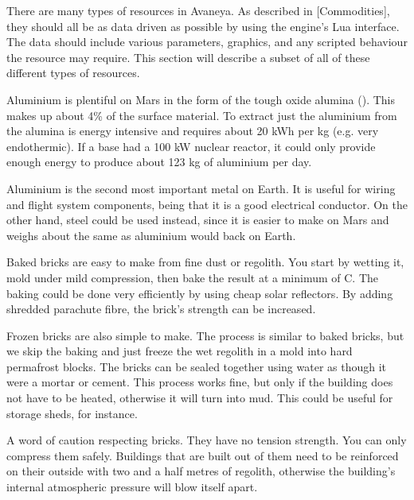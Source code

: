 

There are many types of resources in Avaneya. As described in [Commodities], they should all be as data driven as possible by using the engine’s Lua interface. The data should include various parameters, graphics, and any scripted behaviour the resource may require. This section will describe a subset of all of these different types of resources.

Aluminium is plentiful on Mars in the form of the tough oxide alumina (). This makes up about 4\% of the surface material. To extract just the aluminium from the alumina is energy intensive and requires about 20 kWh per kg (e.g. very endothermic). If a base had a 100 kW nuclear reactor, it could only provide enough energy to produce about 123 kg of aluminium per day.

Aluminium is the second most important metal on Earth. It is useful for wiring and flight system components, being that it is a good electrical conductor. On the other hand, steel could be used instead, since it is easier to make on Mars and weighs about the same as aluminium would back on Earth.

Baked bricks are easy to make from fine dust or regolith. You start by wetting it, mold under mild compression, then bake the result at a minimum of C. The baking could be done very efficiently by using cheap solar reflectors. By adding shredded parachute fibre, the brick's strength can be increased.

Frozen bricks are also simple to make. The process is similar to baked bricks, but we skip the baking and just freeze the wet regolith in a mold into hard permafrost blocks. The bricks can be sealed together using water as though it were a mortar or cement. This process works fine, but only if the building does not have to be heated, otherwise it will turn into mud. This could be useful for storage sheds, for instance.

A word of caution respecting bricks. They have no tension strength. You can only compress them safely. Buildings that are built out of them need to be reinforced on their outside with two and a half metres of regolith, otherwise the building's internal atmospheric pressure will blow itself apart.


